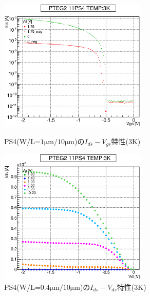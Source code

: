 				\begin{figure}[htbp]
					\begin{minipage}{0.5\hsize}
						\begin{center}
							\includegraphics[width=70mm]{./Chapter/Appendix/Picture/PST/PS4/PTEG2_11_PS4_IdVg_3K.eps}
						\end{center}
						\caption{PS4(W/L=$1\mathrm{\mu m}/10\mathrm{\mu m}$)の$I_{ds}-V_{gs}$特性(3K)}
						\label{fig:PS4_IdVg_3K}
					\end{minipage}
					\begin{minipage}{0.5\hsize}
						\begin{center}
							\includegraphics[width=70mm]{./Chapter/Appendix/Picture/PST/PS4/PTEG2_11_PS4_IdVd_3K.eps}
						\end{center}
						\caption{PS4(W/L=$0.4\mathrm{\mu m}/10\mathrm{\mu m}$)の$I_{ds}-V_{ds}$特性(3K)}
						\label{fig:PS4_IdVd_3K}
					\end{minipage}
				\end{figure}
